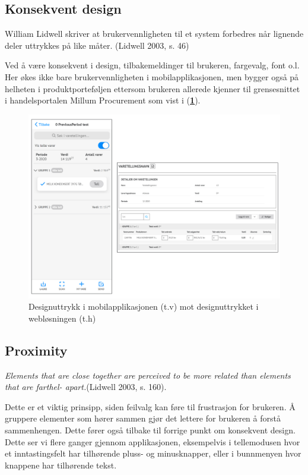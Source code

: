 \subsection{\textbf{Konsekvent design}}
William Lidwell skriver at brukervennligheten til et system forbedres når lignende deler uttrykkes på like måter. (Lidwell 2003, s. 46)

Ved å være konsekvent i design, tilbakemeldinger til brukeren, fargevalg, font o.l. Her økes ikke bare brukervennligheten i mobilapplikasjonen, men bygger også på helheten i produktporteføljen ettersom brukeren allerede kjenner til grensesnittet i handelsportalen Millum Procurement som vist i (\textbf{\ref{Konsekventdesign}}). 

\begin{figure}[H] 
    \centering
    \includegraphics[width=150mm]{figures/Design-utforming/principle_consistency.jpg}
    \caption{Designuttrykk i mobilapplikasjonen (t.v) mot designuttrykket i webløsningen (t.h)}
    \label{Konsekventdesign}
\end{figure}

\subsection{\textbf{Proximity}}
\textit{Elements that are close together are perceived to be more related than elements that are farthel- apart.}(Lidwell 2003, s. 160).

Dette er et viktig prinsipp, siden feilvalg kan føre til frustrasjon for brukeren. Å gruppere elementer som hører sammen gjør det lettere for brukeren å forstå sammenhengen. Dette fører også tilbake til forrige punkt om konsekvent design. Dette ser vi flere ganger gjennom applikasjonen, eksempelvis i tellemodusen hvor et inntastingsfelt har tilhørende pluss- og minusknapper, eller i bunnmenyen hvor knappene har tilhørende tekst.

